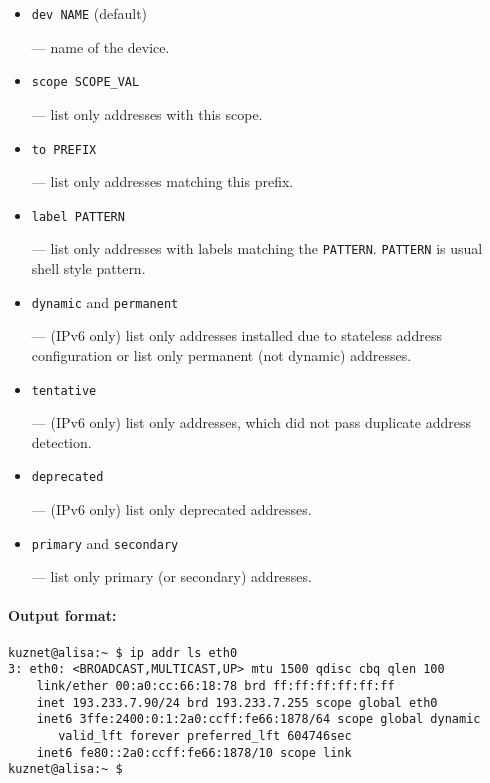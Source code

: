 \begin{itemize}
\item \verb|dev NAME| (default)

--- name of the device.

\item \verb|scope SCOPE_VAL|

--- list only addresses with this scope.

\item \verb|to PREFIX|

--- list only addresses matching this prefix.

\item \verb|label PATTERN|

--- list only addresses with labels matching the \verb|PATTERN|.
\verb|PATTERN| is usual shell style pattern.


\item \verb|dynamic| and \verb|permanent|

--- (IPv6 only) list only addresses installed due to stateless
address configuration or list only permanent (not dynamic) addresses.

\item \verb|tentative|

--- (IPv6 only) list only addresses, which did not pass duplicate
address detection.

\item \verb|deprecated|

--- (IPv6 only) list only deprecated addresses.


\item  \verb|primary| and \verb|secondary|

--- list only primary (or secondary) addresses.

\end{itemize}


\paragraph{Output format:}

\begin{verbatim}
kuznet@alisa:~ $ ip addr ls eth0
3: eth0: <BROADCAST,MULTICAST,UP> mtu 1500 qdisc cbq qlen 100
    link/ether 00:a0:cc:66:18:78 brd ff:ff:ff:ff:ff:ff
    inet 193.233.7.90/24 brd 193.233.7.255 scope global eth0
    inet6 3ffe:2400:0:1:2a0:ccff:fe66:1878/64 scope global dynamic 
       valid_lft forever preferred_lft 604746sec
    inet6 fe80::2a0:ccff:fe66:1878/10 scope link 
kuznet@alisa:~ $ 
\end{verbatim}

